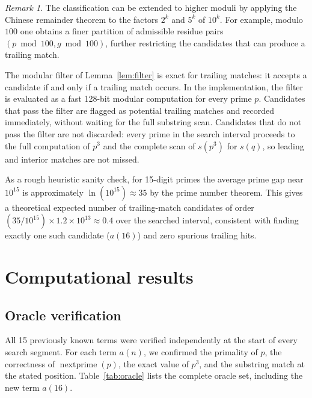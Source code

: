 \documentclass[11pt]{article}
\theoremstyle{definition}
\theoremstyle{remark}
\newtheorem{remark}{Remark}
\newcommand{\np}{\operatorname{nextprime}}
\begin{document}
\begin{remark}
The classification can be extended to higher moduli by applying the
Chinese remainder theorem to the factors $2^k$ and $5^k$ of $10^k$.
For example, modulo $100$ one obtains a finer partition of admissible
residue pairs $(p \bmod 100, g \bmod 100)$, further restricting the
candidates that can produce a trailing match.
\end{remark}

The modular filter of Lemma~\ref{lem:filter} is exact for trailing
matches: it accepts a candidate if and only if a trailing match
occurs.
In the implementation, the filter is evaluated as a fast 128-bit
modular computation for every prime $p$.
Candidates that pass the filter are flagged as potential trailing
matches and recorded immediately, without waiting for the full
substring scan.
Candidates that do not pass the filter are not discarded: every prime
in the search interval proceeds to the full computation of $p^3$ and
the complete scan of $s(p^3)$ for $s(q)$, so leading and interior
matches are not missed.

As a rough heuristic sanity check, for 15-digit primes the average
prime gap near $10^{15}$ is approximately $\ln(10^{15}) \approx 35$
by the prime number theorem.
This gives a theoretical expected number of trailing-match candidates
of order $(35 / 10^{15}) \times 1.2 \times 10^{13} \approx 0.4$
over the searched interval, consistent with finding exactly one such
candidate ($a(16)$) and zero spurious trailing hits.

\section{Computational results}
\label{sec:results}

\subsection{Oracle verification}
\label{sec:oracle}

All 15 previously known terms were verified independently at the start
of every search segment.
For each term $a(n)$, we confirmed the primality of $p$, the
correctness of $\np(p)$, the exact value of $p^3$, and the substring
match at the stated position.
Table~\ref{tab:oracle} lists the complete oracle set, including the
new term $a(16)$.
\end{document}
